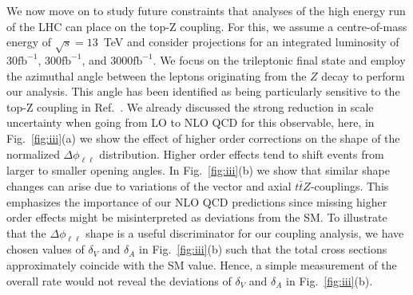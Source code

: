 \documentclass[preprint]{JHEP3} %
\def\ttbZ{t\bar{t}Z}
\def\invfb {\mathrm{fb}^{-1}}
\begin{document}
We now move on to study future constraints that analyses of the high energy run of the LHC can place on the top-Z coupling.
For this, we assume a centre-of-mass energy of $\sqrt{s}=13$~TeV and consider projections for an integrated luminosity of
$30 \invfb$, $300 \invfb$, and $3000 \invfb$. 
We focus on the trileptonic final state and employ the azimuthal angle between the leptons originating
from the $Z$ decay to perform our analysis.
This angle has been identified as being particularly sensitive to the top-Z coupling in Ref.~\cite{baur}.
We already discussed the strong reduction in scale uncertainty when going from LO to NLO QCD for this observable,
here, in Fig.~\ref{fig:iii}(a) we show the effect of higher order corrections
on the shape of the normalized $\Delta \phi_{\ell\ell}$ distribution.
Higher order effects tend to shift events from larger to smaller opening angles.
In Fig.~\ref{fig:iii}(b) we show that similar shape changes can arise due to variations of the vector and axial $\ttbZ$-couplings.
This emphasizes the importance of our NLO QCD predictions since missing higher order effects might be misinterpreted as deviations from the SM.
To illustrate that the $\Delta \phi_{\ell\ell}$ shape is a useful discriminator for our coupling analysis, we have chosen 
values of $\delta_V$ and $\delta_A$ in Fig.~\ref{fig:iii}(b) such that the total cross sections approximately coincide with the SM value.
Hence, a simple measurement of the overall rate would not reveal the deviations of $\delta_V$ and $\delta_A$ in Fig.~\ref{fig:iii}(b).
 
\end{document}
